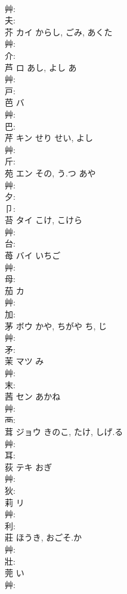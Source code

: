 \documentclass[8pt]{extreport}
\begin{document}
\begin{CJK}{UTF8}{min}
\\	艸: 
\\	夫: 
\\	芥	カイ	からし, ごみ, あくた		
\\	艸: 
\\	介: 
\\	芦	ロ	あし, よし	あ	
\\	艸: 
\\	戸: 
\\	芭	バ			
\\	艸: 
\\	巴: 
\\	芹	キン	せり	せい, よし	
\\	艸: 
\\	斤: 
\\	苑	エン	その, う.つ	あや	
\\	艸: 
\\	夕: 
\\	卩: 
\\	苔	タイ	こけ, こけら		
\\	艸: 
\\	台: 
\\	苺	バイ	いちご		
\\	艸: 
\\	母: 
\\	茄	カ			
\\	艸: 
\\	加: 
\\	茅	ボウ	かや, ちがや	ち, じ	
\\	艸: 
\\	矛: 
\\	茉	マツ		み	
\\	艸: 
\\	末: 
\\	茜	セン	あかね		
\\	艸: 
\\	襾: 
\\	茸	ジョウ	きのこ, たけ, しげ.る		
\\	艸: 
\\	耳: 
\\	荻	テキ	おぎ		
\\	艸: 
\\	狄: 
\\	莉	リ			
\\	艸: 
\\	利: 
\\	莊		ほうき, おごそ.か				
\\	艸: 
\\	壯: 
\\	莞		い			
\\	艸: 

\end{CJK}
\end{document}
